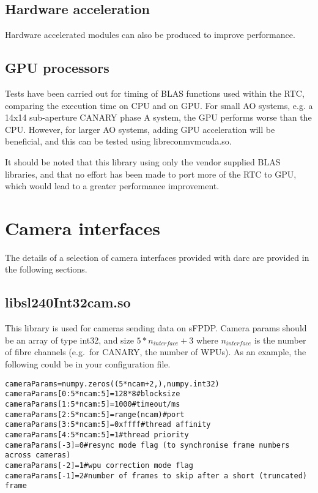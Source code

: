 \documentclass[a4,10pt]{article}
\begin{document}
\subsection{Hardware acceleration}
Hardware accelerated modules can also be produced to improve performance.


\subsection{GPU processors}
Tests have been carried out for timing of BLAS functions used within
the RTC, comparing the execution time on CPU and on GPU.  For small AO
systems, e.g. a 14x14 sub-aperture CANARY phase A system, the GPU performs
worse than the CPU.  However, for larger AO systems, adding GPU
acceleration will be beneficial, and this can be tested using
libreconmvmcuda.so.

It should be noted that this library using only the vendor supplied
BLAS libraries, and that no effort has been made to port more of the
RTC to GPU, which would lead to a greater performance improvement.



\section{Camera interfaces}
The details of a selection of camera interfaces provided with darc are
provided in the following sections.

\subsection{libsl240Int32cam.so}
This library is used for cameras sending data on sFPDP.  Camera params
should be an array of type int32, and size $5*n_{interface}+3$ where
$n_{interface}$ is the number of fibre channels (e.g.\ for CANARY, the
number of WPUs).  As an example, the following could be in your
configuration file.
\begin{verbatim}
cameraParams=numpy.zeros((5*ncam+2,),numpy.int32)
cameraParams[0:5*ncam:5]=128*8#blocksize
cameraParams[1:5*ncam:5]=1000#timeout/ms
cameraParams[2:5*ncam:5]=range(ncam)#port
cameraParams[3:5*ncam:5]=0xffff#thread affinity
cameraParams[4:5*ncam:5]=1#thread priority
cameraParams[-3]=0#resync mode flag (to synchronise frame numbers across cameras)
cameraParams[-2]=1#wpu correction mode flag
cameraParams[-1]=2#number of frames to skip after a short (truncated) frame
\end{verbatim}
\end{document}
